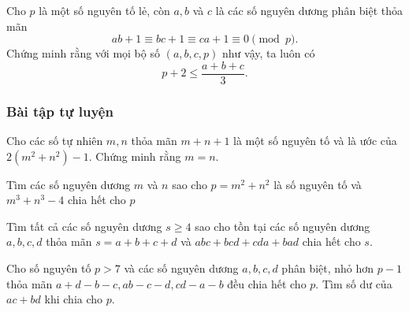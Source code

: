 \begin{bx}
Cho $p$ là một số nguyên tố lẻ, còn $a,b$ và $c$ là các số nguyên dương phân biệt thỏa mãn
$$ab+1\equiv bc+1\equiv ca+1\equiv 0\pmod{p}.$$
Chứng minh rằng với mọi bộ số $(a,b,c,p)$ như vậy, ta luôn có
\[p+2 \leq \frac{a+b+c}{3}.\]
\end{bx}

\subsubsection*{Bài tập tự luyện}

\begin{btt}
Cho các số tự nhiên $m, n$ thỏa mãn $m+n+1$ là một số nguyên tố và là ước của $2\left(m^2+n^2\right)-1$. Chứng minh rằng $m=n.$
\end{btt}

\begin{btt}
Tìm các số nguyên dương ${m}$ và ${n}$ sao cho ${p}={m}^{2}+{n}^{2}$ là số nguyên tố và
${m}^{3}+{n}^{3}-4$ chia hết cho ${p}$
\end{btt}

\begin{btt}
Tìm tất cả các số nguyên dương $s\ge 4$ sao cho tồn tại các số nguyên dương $a,b,c,d$ thỏa mãn $s=a+b+c+d$ và $abc+bcd+cda+bad$ chia hết cho $s.$
\end{btt}

\begin{btt}
Cho số nguyên tố $p>7$ và các số nguyên dương $a,b,c,d$ phân biệt, nhỏ hơn $p-1$ thỏa mãn $a+d-b-c,ab-c-d,cd-a-b$ đều chia hết cho $p.$ Tìm số dư của $ac+bd$ khi chia cho $p.$
\end{btt}

